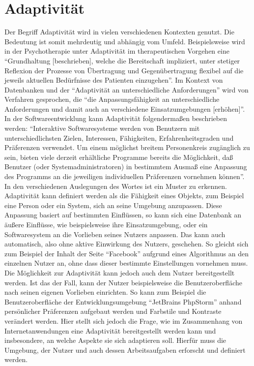 \documentclass[12pt, paper=a4, bibtotoc, toc=listof, headsepline=true, numbers=endperiod]{scrreprt}
\begin{document}
\chapter{Adaptivität}
Der Begriff Adaptivität wird in vielen verschiedenen Kontexten genutzt. Die Bedeutung ist somit mehrdeutig und abhängig vom Umfeld. Beispielsweise wird in der Psychotherapie unter Adaptivität im therapeutischen Vorgehen eine \enquote{Grundhaltung [beschrieben], welche die Bereitschaft impliziert, unter stetiger Reflexion der Prozesse von Übertragung und Gegenübertragung flexibel auf die jeweils aktuellen Bedürfnisse des Patienten einzugehen}\cite[S. 45]{woeller2014tiefenpsychologisch}. Im Kontext von Datenbanken und der \enquote{Adaptivität an unterschiedliche Anforderungen} wird von Verfahren gesprochen, die \enquote{die Anpassungsfähigkeit an unterschiedliche Anforderungen und damit auch an verschiedene Einsatzumgebungen [erhöhen]}\cite[][S. 112]{loeser2013web}.
In der Softwareentwicklung kann Adaptivität folgendermaßen beschrieben werden: \enquote{Interaktive Softwaresysteme werden von Benutzern mit unterschiedlichsten Zielen, Interessen, Fähigkeiten, Erfahrenheitsgraden und Präferenzen verwendet. Um einem möglichst breitem Personenkreis zugänglich zu sein, bieten viele derzeit erhältliche Programme bereits die Möglichkeit, daß Benutzer (oder Systemadministratoren) in bestimmtem Ausmaß eine Anpassung des Programms an die jeweiligen individuellen Präferenzen vornehmen können}\cite[S. 1]{Kobsa1993}.
\newline In den verschiedenen Auslegungen des Wortes ist ein Muster zu erkennen. Adaptivität kann definiert werden als die Fähigkeit eines Objekts, zum Beispiel eine Person oder ein System, sich an seine Umgebung anzupassen. Diese Anpassung basiert auf bestimmten Einflüssen, so kann sich eine Datenbank an äußere Einflüsse, wie beispielsweise ihre Einsatzumgebung, oder ein Softwaresystem an die Vorlieben seines Nutzers anpassen. Das kann auch automatisch, also ohne aktive Einwirkung des Nutzers, geschehen. So gleicht sich zum Beispiel der Inhalt der Seite \enquote{Facebook} aufgrund eines Algorithmus an den einzelnen Nutzer an, ohne dass dieser bestimmte Einstellungen vornehmen muss\cite{Rixecker2016}. Die Möglichkeit zur Adaptivität kann jedoch auch dem Nutzer bereitgestellt werden. Ist das der Fall, kann der Nutzer beispielsweise die Benutzeroberfläche nach seinen eigenen Vorlieben einrichten. So kann zum Beispiel die Benutzeroberfläche der Entwicklungsumgebung \enquote{JetBrains PhpStorm} anhand persönlicher Präferenzen aufgebaut werden und Farbstile und Kontraste verändert werden.
\newline Hier stellt sich jedoch die Frage, wie im Zusammenhang von Internetanwendungen eine Adaptivität bereitgestellt werden kann und insbesondere, an welche Aspekte sie sich adaptieren soll. Hierfür muss die Umgebung, der Nutzer und auch dessen Arbeitsaufgaben erforscht und definiert werden.
\end{document}
